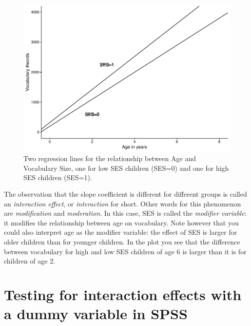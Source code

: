\documentclass[]{book}\usepackage[]{graphicx}\usepackage[]{color}
\makeatletter
\def\maxwidth{ %
  \ifdim\Gin@nat@width>\linewidth
    \linewidth
  \else
    \Gin@nat@width
  \fi
}
\newenvironment{knitrout}{}{} %
\makeatother
\begin{document}
\begin{knitrout}
\color{fgcolor}\begin{figure}
\includegraphics[width=\maxwidth]{figure/summary_plot-1} \caption[Two regression lines for the relationship between Age and Vocabulary Size, one for low SES children (SES=0) and one for high SES children (SES=1)]{Two regression lines for the relationship between Age and Vocabulary Size, one for low SES children (SES=0) and one for high SES children (SES=1).}\label{fig:summary_plot}
\end{figure}


\end{knitrout}


The observation that the slope coefficient is different for different groups is called an \textit{interaction effect}, or \textit{interaction} for short. Other words for this phenomenon are \textit{modification} and \textit{moderation}. In this case, SES is called the \textit{modifier variable}: it modifies the relationship between age on vocabulary. Note however that you could also interpret age as the modifier variable: the effect of SES is larger for older children than for younger children. In the plot you see that the difference between vocabulary for high and low SES children of age 6 is larger than it is for children of age 2.


\section{Testing for interaction effects with a dummy variable in SPSS}
\end{document}
